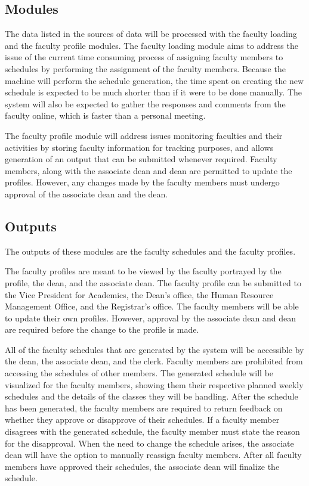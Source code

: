 \subsection{Modules}
The data listed in the sources of data will be processed with the faculty loading and the faculty profile modules. The faculty loading module aims to address the issue of the current time consuming process of assigning faculty members to schedules by performing the assignment of the faculty members. Because the machine will perform the schedule generation, the time spent on creating the new schedule is expected to be much shorter than if it were to be done manually. The system will also be expected to gather the responses and comments from the faculty online, which is faster than a personal meeting. 

The faculty profile module will address issues monitoring faculties and their activities by storing faculty information for tracking purposes, and allows generation of an output that can be submitted whenever required. Faculty members, along with the associate dean and dean are permitted to update the profiles. However, any changes made by the faculty members must undergo approval of the associate dean and the dean.

\subsection{Outputs}
The outputs of these modules are the faculty schedules and the faculty profiles.

The faculty profiles are meant to be viewed by the faculty portrayed by the profile, the dean, and the associate dean. The faculty profile can be submitted to the Vice President for Academics, the Dean's office, the Human Resource Management Office, and the Registrar's office. The faculty members will be able to update their own profiles. However, approval by the associate dean and dean are required before the change to the profile is made.

All of the faculty schedules that are generated by the system will be accessible by the dean, the associate dean, and the clerk. Faculty members are prohibited from accessing the schedules of other members. The generated schedule will be visualized for the faculty members, showing them their respective planned weekly schedules and the details of the classes they will be handling. After the schedule has been generated, the faculty members are required to return feedback on whether they approve or disapprove of their schedules. If a faculty member disagrees with the generated schedule, the faculty member must state the reason for the disapproval. When the need to change the schedule arises, the associate dean will have the option to manually reassign faculty members. After all faculty members have approved their schedules, the associate dean will finalize the schedule.

